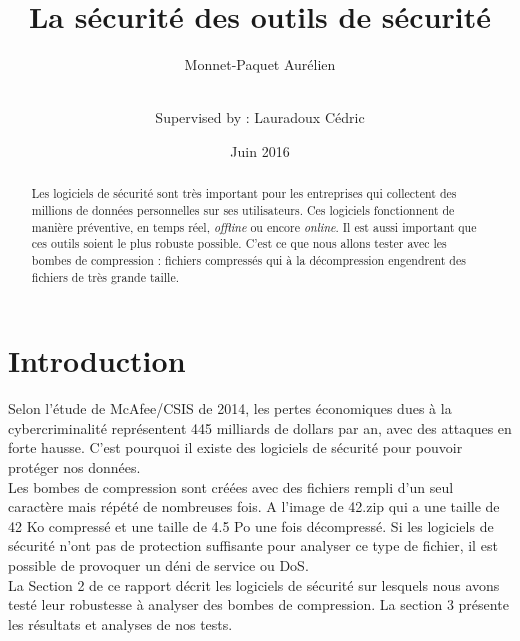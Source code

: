 \documentclass{svjour3}
\begin{document}
\title{La sécurité des outils de sécurité}


\author{Monnet-Paquet Aurélien  \\ \and \\
        Supervised by : Lauradoux Cédric
}



\date{Juin 2016}


\maketitle

\begin{abstract}
Les logiciels de sécurité sont très important pour les entreprises qui collectent des millions de données personnelles sur ses utilisateurs. Ces logiciels fonctionnent de manière préventive, en temps réel, \textit{offline} ou encore \textit{online}. Il est aussi important que ces outils soient le plus robuste possible. C'est ce que nous allons tester avec les bombes de compression : fichiers compressés qui à la décompression engendrent des fichiers de très grande taille.

\end{abstract}

\section{Introduction}
\label{intro}
Selon l'étude de McAfee/CSIS de 2014, les pertes économiques dues à la cybercriminalité représentent 445 milliards de dollars par an, avec des attaques en forte hausse. C'est pourquoi il existe des logiciels de sécurité pour pouvoir protéger nos données.\\
Les bombes de compression sont créées avec des fichiers rempli d'un seul caractère mais répété de nombreuses fois. A l'image de 42.zip qui a une taille de 42 Ko compressé et une taille de 4.5 Po une fois décompressé. Si les logiciels de sécurité n'ont pas de protection suffisante pour analyser ce type de fichier, il est possible de provoquer un déni de service ou DoS.\\
La Section 2 de ce rapport décrit les logiciels de sécurité sur lesquels nous avons testé leur robustesse à analyser des bombes de compression. La section 3 présente les résultats et analyses de nos tests.
\end{document}
